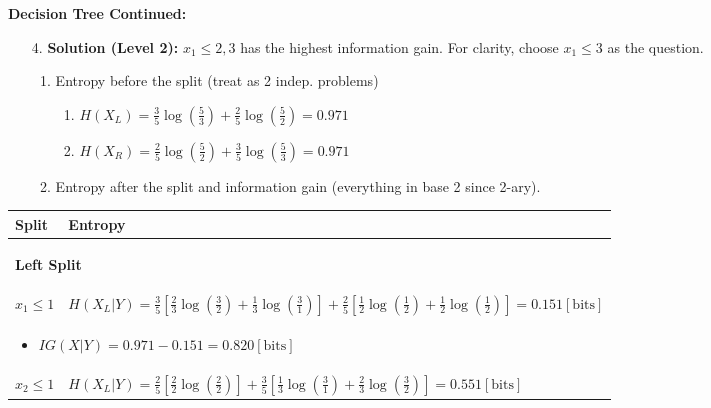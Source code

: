 \begin{example} \textbf{Decision Tree Continued:}
    \begin{enumerate}
        \item[4.] \textbf{Solution (Level 2):} $x_1 \leq 2,3$ has the highest information gain. For clarity, choose \(x_1 \leq 3\) as the question. 
        \begin{enumerate}
            \item Entropy before the split (treat as 2 indep. problems) 
            \begin{enumerate}
                \item $H(X_{L}) = \frac{3}{5} \log\left(\frac{5}{3}\right) + \frac{2}{5} \log\left(\frac{5}{2}\right) = 0.971$
                \item $H(X_{R}) = \frac{2}{5} \log\left(\frac{5}{2}\right) + \frac{3}{5} \log\left(\frac{5}{3}\right) = 0.971$
            \end{enumerate}
            \item Entropy after the split and information gain (everything in base 2 since 2-ary).
        \end{enumerate}
    \end{enumerate}
    \begin{center}
        \begin{tabular}{ll}
            \textbf{Split} & \textbf{Entropy} \\
            \toprule
            \multicolumn{2}{p{\linewidth}}{
            \begin{center}
                \textbf{Left Split}
            \end{center}} \\
            \toprule
            \(x_1 \leq 1\) & $H(X_{L} | Y) = \frac{3}{5} \left[\frac{2}{3} \log \left(\frac{3}{2}\right) + \frac{1}{3} \log \left(\frac{3}{1}\right) \right] + \frac{2}{5} \left[\frac{1}{2} \log \left(\frac{1}{2}\right) + \frac{1}{2} \log \left(\frac{1}{2}\right) \right] = 0.151 [\text{bits}]$ \\
            \multicolumn{2}{p{\linewidth}}{
            \begin{itemize}
                \item $IG(X|Y) = 0.971 - 0.151 = 0.820 [\text{bits}]$
            \end{itemize}} \\
            \midrule
            \(x_2 \leq 1\) & $H(X_{L} | Y) = \frac{2}{5} \left[\frac{2}{2} \log \left(\frac{2}{2}\right) \right] + \frac{3}{5} \left[\frac{1}{3} \log \left(\frac{3}{1}\right) + \frac{2}{3} \log \left(\frac{3}{2}\right) \right] = 0.551 [\text{bits}]$ \\

\end{tabular}
\end{center}
\end{example}
